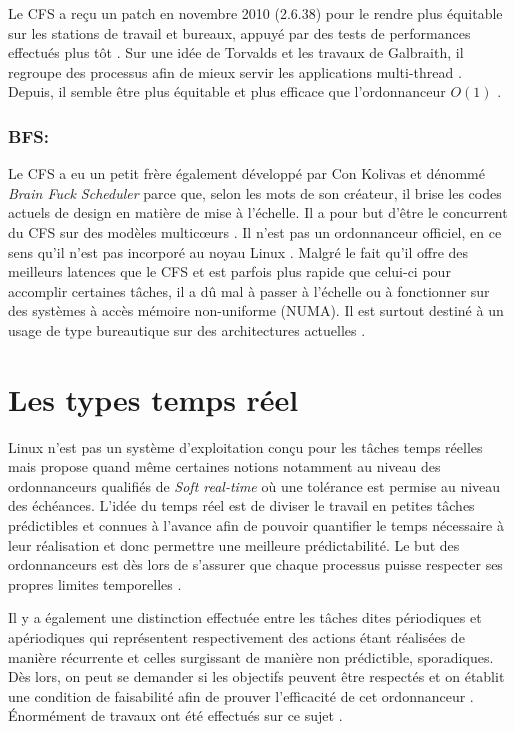 \documentclass[letterpaper]{article}
\begin{document}
Le CFS a reçu un patch en novembre 2010 (2.6.38) pour le rendre plus équitable sur les stations de travail et bureaux, appuyé par des tests de performances effectués plus tôt \citep{7280991}. Sur une idée de Torvalds et les travaux de Galbraith, il regroupe des processus afin de mieux servir les applications multi-thread \citep{Wong:2008:TAF:1400097.1400102}. Depuis, il semble être plus équitable et plus efficace que l'ordonnanceur $O(1)$ \citep{4631872}.

\subsubsection{BFS:}

Le CFS a eu un petit frère également développé par Con Kolivas et dénommé \textit{Brain Fuck Scheduler} parce que, selon les mots de son créateur, il brise les codes actuels de design en matière de mise à l'échelle. Il a pour but d'être le concurrent du CFS sur des modèles multicœurs \citep{PATCHBFS}. Il n'est pas un ordonnanceur officiel, en ce sens qu'il n'est pas incorporé au noyau Linux \citep{opac-b1133216}. Malgré le fait qu'il offre des meilleurs latences que le CFS et est parfois plus rapide que celui-ci pour accomplir certaines tâches, il a dû mal à passer à l'échelle ou à fonctionner sur des systèmes à accès mémoire non-uniforme (NUMA). Il est surtout destiné à un usage de type bureautique sur des architectures actuelles \citep{CFSVSBFS}.

\section{Les types temps réel}

Linux n'est pas un système d'exploitation conçu pour les tâches temps réelles mais propose quand même certaines notions notamment au niveau des ordonnanceurs qualifiés de \textit{Soft real-time} où une tolérance est permise au niveau des échéances. L'idée du temps réel est de diviser le travail en petites tâches prédictibles et connues à l'avance afin de pouvoir quantifier le temps nécessaire à leur réalisation et donc permettre une meilleure prédictabilité. Le but des ordonnanceurs est dès lors de s'assurer que chaque processus puisse respecter ses propres limites temporelles \citep{stankovic2012deadline}.

Il y a également une distinction effectuée entre les tâches dites périodiques et apériodiques qui représentent respectivement des actions étant réalisées de manière récurrente et celles surgissant de manière non prédictible, sporadiques. Dès lors, on peut se demander si les objectifs peuvent être respectés et on établit une condition de faisabilité afin de prouver l'efficacité de cet ordonnanceur \citep{128746}. Énormément de travaux ont été effectués sur ce sujet \citep{Sha:2004:RTS:1028913.1028959}.
\end{document}
